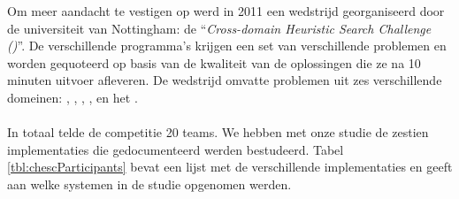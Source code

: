 Om meer aandacht te vestigen op \abhf{} werd in 2011 een wedstrijd georganiseerd door de universiteit van Nottingham: de ``\emph{Cross-domain Heuristic Search Challenge (\abchescy)}''\cite{Burke:2011:CHS:2177360.2177415}. De verschillende programma's krijgen een set van verschillende problemen en worden gequoteerd op basis van de kwaliteit van de oplossingen die ze na 10 minuten uitvoer afleveren.%
De wedstrijd omvatte problemen uit zes verschillende domeinen: , , , ,  en het .

\paragraph{}
In totaal telde de competitie 20 teams. We hebben met onze studie de zestien implementaties die gedocumenteerd werden bestudeerd. Tabel \ref{tbl:chescParticipants} bevat een lijst met de verschillende implementaties en geeft aan welke systemen in de studie opgenomen werden.

